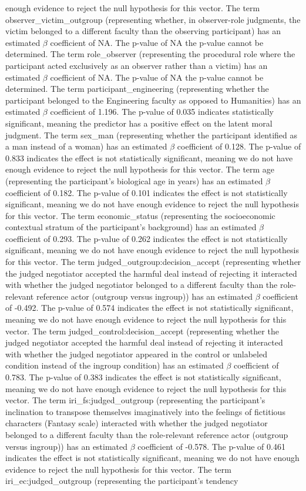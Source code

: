 \documentclass[11pt]{article}
\begin{document}
enough evidence to reject the null hypothesis for this vector. The term observer\_victim\_outgroup (representing whether, in observer-role judgments, the victim belonged to a different faculty than the observing participant) has an estimated $\beta$ coefficient of NA. The p-value of NA the p-value cannot be determined. The term role\_observer (representing the procedural role where the participant acted exclusively as an observer rather than a victim) has an estimated $\beta$ coefficient of NA. The p-value of NA the p-value cannot be determined. The term participant\_engineering (representing whether the participant belonged to the Engineering faculty as opposed to Humanities) has an estimated $\beta$ coefficient of 1.196. The p-value of 0.035 indicates statistically significant, meaning the predictor has a positive effect on the latent moral judgment. The term sex\_man (representing whether the participant identified as a man instead of a woman) has an estimated $\beta$ coefficient of 0.128. The p-value of 0.833 indicates the effect is not statistically significant, meaning we do not have enough evidence to reject the null hypothesis for this vector. The term age (representing the participant's biological age in years) has an estimated $\beta$ coefficient of 0.182. The p-value of 0.101 indicates the effect is not statistically significant, meaning we do not have enough evidence to reject the null hypothesis for this vector. The term economic\_status (representing the socioeconomic contextual stratum of the participant's background) has an estimated $\beta$ coefficient of 0.293. The p-value of 0.262 indicates the effect is not statistically significant, meaning we do not have enough evidence to reject the null hypothesis for this vector. The term judged\_outgroup:decision\_accept (representing whether the judged negotiator accepted the harmful deal instead of rejecting it interacted with whether the judged negotiator belonged to a different faculty than the role-relevant reference actor (outgroup versus ingroup)) has an estimated $\beta$ coefficient of -0.492. The p-value of 0.574 indicates the effect is not statistically significant, meaning we do not have enough evidence to reject the null hypothesis for this vector. The term judged\_control:decision\_accept (representing whether the judged negotiator accepted the harmful deal instead of rejecting it interacted with whether the judged negotiator appeared in the control or unlabeled condition instead of the ingroup condition) has an estimated $\beta$ coefficient of 0.783. The p-value of 0.383 indicates the effect is not statistically significant, meaning we do not have enough evidence to reject the null hypothesis for this vector. The term iri\_fs:judged\_outgroup (representing the participant's inclination to transpose themselves imaginatively into the feelings of fictitious characters (Fantasy scale) interacted with whether the judged negotiator belonged to a different faculty than the role-relevant reference actor (outgroup versus ingroup)) has an estimated $\beta$ coefficient of -0.578. The p-value of 0.461 indicates the effect is not statistically significant, meaning we do not have enough evidence to reject the null hypothesis for this vector. The term iri\_ec:judged\_outgroup (representing the participant's tendency 
\end{document}
